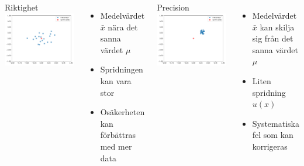 \documentclass[9pt]{beamer}
\newcommand*\mean[1]{\bar{#1}}
\begin{document}
    \begin{frame}
        \begin{columns}[T]
                Riktighet
                \vfill
                \includegraphics[width=\textwidth]{riktighet.pdf}
                \begin{itemize}
                    \item Medelvärdet $\mean{x}$ nära det sanna värdet $\mu$
                    \item Spridningen kan vara stor
                    \item Osäkerheten kan förbättras med mer data
                \end{itemize}
                Precision
                \vfill
                \includegraphics[width=\textwidth]{precision.pdf}
                \begin{itemize}
                    \item Medelvärdet $\mean{x}$ kan skilja sig från det sanna värdet $\mu$
                    \item Liten spridning $u(x)$
                    \item Systematiska fel som kan korrigeras
                \end{itemize}
        \end{columns}


\end{frame}
\end{document}

